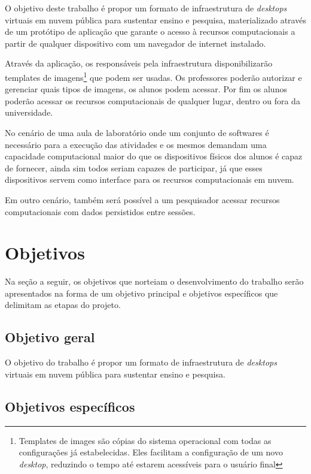 O objetivo deste trabalho é propor um formato de infraestrutura de \textit{desktops} virtuais em nuvem pública para sustentar ensino e pesquisa, materializado através de um protótipo de aplicação que garante o acesso à recursos computacionais a partir de qualquer dispositivo com um navegador de internet instalado.

Através da aplicação, os responsáveis pela infraestrutura disponibilizarão templates de imagens\footnote{Templates de images são cópias do sistema operacional com todas as configurações já estabelecidas. Eles facilitam a configuração de um novo \textit{desktop}, reduzindo o tempo até estarem acessíveis para o usuário final} que podem ser usadas. Os professores poderão autorizar e gerenciar quais tipos de imagens, os alunos podem acessar. Por fim os alunos poderão acessar os recursos computacionais de qualquer lugar, dentro ou fora da universidade.

No cenário de uma aula de laboratório onde um conjunto de softwares é necessário para a execução das atividades e os mesmos demandam uma capacidade computacional maior do que os dispositivos físicos dos alunos é capaz de fornecer, ainda sim todos seriam capazes de participar, já que esses dispositivos servem como interface para os recursos computacionais em nuvem.

Em outro cenário, também será possível a um pesquisador acessar recursos computacionais com dados persistidos entre sessões. 

\section{Objetivos}\label{sec:objetivos}

Na seção a seguir, os objetivos que norteiam o desenvolvimento do trabalho serão apresentados na forma de um objetivo principal e objetivos específicos que delimitam as etapas do projeto.

\subsection{Objetivo geral}\label{subsec:objetivoGeral}

O objetivo do trabalho é propor um formato de infraestrutura de \textit{desktops} virtuais em nuvem pública para sustentar ensino e pesquisa.

\subsection{Objetivos específicos}\label{subsec:objetivosEspecificos}


